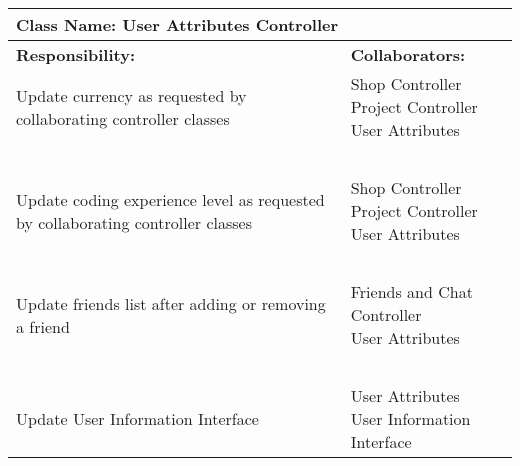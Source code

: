 \documentclass[]{article}
\begin{document}
\begin{table}[H]
    \centering
    \begin{tabular}{|p{7.5cm}|p{7.5cm}|}
        \hline
        \multicolumn{2}{|l|}{\textbf{Class Name:} User Attributes Controller}\\
        \hline
        \textbf{Responsibility:} & \textbf{Collaborators:}\\
        \hline
        Update currency as requested by collaborating controller classes & \makecell[l]{Shop Controller\\Project Controller\\User Attributes}\\
        ~ & ~\\
        Update coding experience level as requested by collaborating controller classes & \makecell[l]{Shop Controller\\Project Controller\\User Attributes}\\
        ~ & ~\\
        Update friends list after adding or removing a friend & \makecell[l]{Friends and Chat Controller\\User Attributes}\\
        ~ & ~\\
        Update User Information Interface & \makecell[l]{User Attributes\\User Information Interface}\\
        \hline
    \end{tabular}
\end{table}
\end{document}
